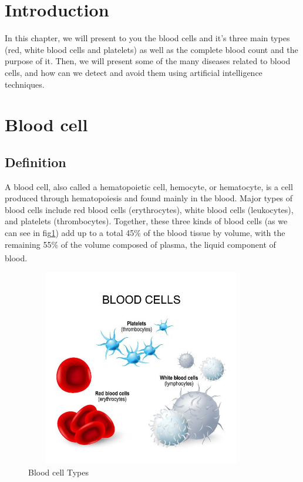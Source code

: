 \section{Introduction}
\vspace{0.2in}
\hspace*{0.16in}

In this chapter, we will present to you the blood cells and it's three main types (red, white blood cells and platelets) as well as the complete blood count and the purpose of it. Then, we will present some of the many diseases related to blood cells, and how can we detect and avoid them using artificial intelligence techniques.

\section{Blood cell}
\subsection{Definition}

A blood cell, also called a hematopoietic cell, hemocyte, or hematocyte, is a cell produced through hematopoiesis and found mainly in the blood. Major types of blood cells include red blood cells (erythrocytes), white blood cells (leukocytes), and platelets (thrombocytes). Together, these three kinds of blood cells (as we can see in fig\ref{fig:bloodCellTypes}) add up to a total 45\% of the blood tissue by volume, with the remaining 55\% of the volume composed of plasma, the liquid component of blood. \textsuperscript{\cite{hopkins1993human}}\\

\vspace{0.1in}

\begin{figure}[h]
\centering
  \vspace{-0.1in}
    \centerline{\includegraphics[width = 4in, height = 3.4in]{../images/BloodCells.jpg}}
    \caption{Blood cell Types}
    \label{fig:bloodCellTypes}
\end{figure}

